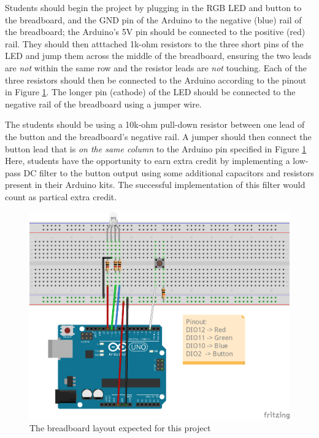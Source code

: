 \documentclass{article}
\begin{document}
    Students should begin the project by plugging in the RGB LED and button to the breadboard, and the GND pin of the Arduino to the negative (blue) rail of the breadboard; the Arduino's 5V pin should be connected to the positive (red) rail.
    They should then atttached 1k-ohm resistors to the three short pins of the LED and jump them across the middle of the breadboard, ensuring the two leads are \emph{not} within the same row and the resistor leads are \emph{not} touching.
    Each of the three resistors should then be connected to the Arduino according to the pinout in Figure \ref{fig:rgb_led_bb}.
    The longer pin (cathode) of the LED should be connected to the negative rail of the breadboard using a jumper wire.

    The students should be using a 10k-ohm pull-down resistor between one lead of the button and the breadboard's negative rail.
    A jumper should then connect the button lead that is \emph{on the same column} to the Arduino pin  specified in Figure \ref{fig:rgb_led_bb}
    Here, students have the opportunity to earn extra credit by implementing a low-pass DC filter to the button output using some additional capacitors and resistors present in their Arduino kits.
    The successful implementation of this filter would count as partical extra credit.

    \begin{figure}[ht!]
        \centering
        \includegraphics[]{p1_rgb_led_bb.png}
        \caption[]{The breadboard layout expected for this project}
        \label{fig:rgb_led_bb}
    \end{figure}
\end{document}
